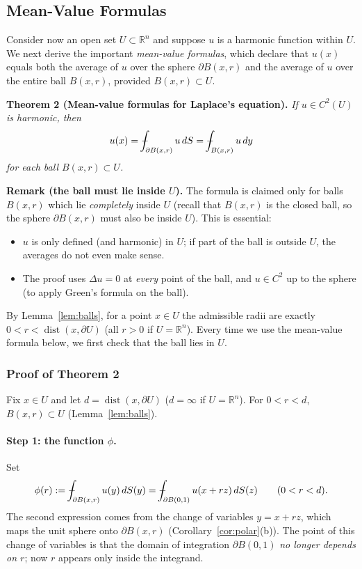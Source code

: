 \documentclass[11pt]{article}
\def\Xint#1{\mathchoice
  {\XXint\displaystyle\textstyle{#1}}%
  {\XXint\textstyle\scriptstyle{#1}}%
  {\XXint\scriptstyle\scriptscriptstyle{#1}}%
  {\XXint\scriptscriptstyle\scriptscriptstyle{#1}}%
  \!\int}
\def\XXint#1#2#3{{\setbox0=\hbox{$#1{#2#3}{\int}$}
  \vcenter{\hbox{$#2#3$}}\kern-.5\wd0}}
\def\fint{\Xint-}
\theoremstyle{plain}
\theoremstyle{definition}
\theoremstyle{remark}
\begin{document}
\subsection{Mean-Value Formulas}

Consider now an open set $U \subset \mathbb{R}^n$ and suppose $u$ is a harmonic function within $U$. We next derive the important \emph{mean-value formulas}, which declare that $u(x)$ equals both the average of $u$ over the sphere $\partial B(x,r)$ and the average of $u$ over the entire ball $B(x,r)$, provided $B(x,r) \subset U$.

\textbf{Theorem 2 (Mean-value formulas for Laplace's equation).} \textit{If $u \in C^2(U)$ is harmonic, then}
\begin{equation}\label{eq:mvf}
u(x) = \fint_{\partial B(x,r)} u\, dS = \fint_{B(x,r)} u\, dy
\end{equation}
\textit{for each ball $B(x,r) \subset U$.}

\textbf{Remark (the ball must lie inside $U$).} The formula is claimed only for balls $B(x,r)$ which lie \emph{completely} inside $U$ (recall that $B(x,r)$ is the closed ball, so the sphere $\partial B(x,r)$ must also be inside $U$). This is essential:
\begin{itemize}
    \item $u$ is only defined (and harmonic) in $U$; if part of the ball is outside $U$, the averages do not even make sense.
    \item The proof uses $\Delta u = 0$ at \emph{every} point of the ball, and $u \in C^2$ up to the sphere (to apply Green's formula on the ball).
\end{itemize}
By Lemma~\ref{lem:balls}, for a point $x \in U$ the admissible radii are exactly $0 < r < \operatorname{dist}(x,\partial U)$ (all $r > 0$ if $U = \mathbb{R}^n$). Every time we use the mean-value formula below, we first check that the ball lies in $U$.

\subsubsection{Proof of Theorem 2}
Fix $x \in U$ and let $d = \operatorname{dist}(x,\partial U)$ ($d = \infty$ if $U = \mathbb{R}^n$). For $0 < r < d$, $B(x,r) \subset U$ (Lemma~\ref{lem:balls}).

\paragraph{Step 1: the function $\phi$.} Set
$$ \phi(r) := \fint_{\partial B(x,r)} u(y)\, dS(y) = \fint_{\partial B(0,1)} u(x + rz)\, dS(z) \qquad (0 < r < d). $$
The second expression comes from the change of variables $y = x + rz$, which maps the unit sphere onto $\partial B(x,r)$ (Corollary~\ref{cor:polar}(b)). The point of this change of variables is that the domain of integration $\partial B(0,1)$ \emph{no longer depends on $r$}; now $r$ appears only inside the integrand.
\end{document}
